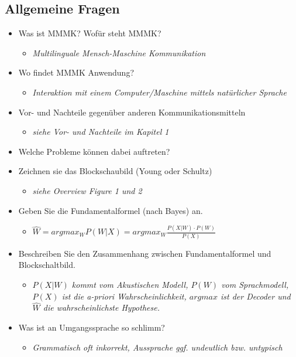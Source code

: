 \subsection{Allgemeine Fragen}
\begin{itemize}
\item Was ist MMMK? Wofür steht MMMK?
\begin{itemize}
\item \emph{Multilinguale Mensch-Maschine Kommunikation}
\end{itemize}
\item Wo findet MMMK Anwendung?
\begin{itemize}
\item \emph{Interaktion mit einem Computer/Maschine  mittels natürlicher Sprache}
\end{itemize}
\item Vor- und Nachteile gegenüber anderen Kommunikationsmitteln
\begin{itemize}
\item \emph{siehe Vor- und Nachteile im Kapitel 1} %
\end{itemize}
\item Welche Probleme können dabei auftreten?
\item Zeichnen sie das Blockschaubild (Young oder Schultz)
\begin{itemize}
\item \emph{siehe Overview Figure 1 und 2} %
\end{itemize}
\item Geben Sie die Fundamentalformel (nach Bayes) an.
\begin{itemize}
\item $\hat{W} = argmax_{W} P(W | X) = argmax_{W} \frac{P(X|W) \cdot P(W)}{P(X)}$ 
\end{itemize}
\item Beschreiben Sie den Zusammenhang zwischen Fundamentalformel und Blockschaltbild.
\begin{itemize}
\item\emph{$P(X|W)$ kommt vom Akustischen Modell, $P(W)$ vom Sprachmodell, $P(X)$ ist die a-priori Wahrscheinlichkeit, 
$argmax$ ist der Decoder und $\hat{W}$ die wahrscheinlichste Hypothese.}
\end{itemize}
\item Was ist an Umgangssprache so schlimm?
\begin{itemize}
\item \emph{Grammatisch oft inkorrekt, Aussprache ggf. undeutlich bzw. untypisch}

\end{itemize}
\end{itemize}
